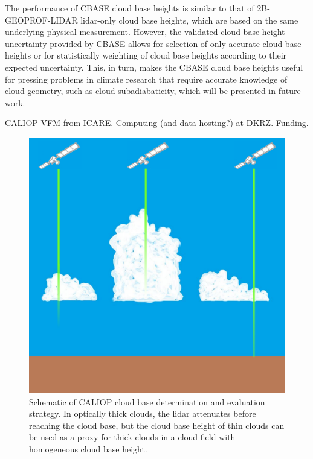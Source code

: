 \documentclass[amt,manuscript]{copernicus}\usepackage[]{graphicx}\usepackage[]{color}
\begin{document}
The performance of CBASE cloud base heights is similar to that of
2B-GEOPROF-LIDAR lidar-only cloud base heights, which are based on the same
underlying physical measurement.  However, the validated cloud base height
uncertainty provided by CBASE allows for selection of only accurate cloud base
heights or for statistically weighting of cloud base heights according to their
expected uncertainty.  This, in turn, makes the CBASE cloud base heights useful
for pressing problems in climate research that require accurate knowledge of
cloud geometry, such as cloud subadiabaticity, which will be presented in future
work. 

\begin{acknowledgements}
CALIOP VFM from ICARE.  Computing (and data hosting?) at DKRZ.  Funding.
\end{acknowledgements}


\begin{figure}
  \centering
  \includegraphics[width=0.5\linewidth,keepaspectratio=true]{CloudFieldCALIOP.pdf}
  \caption{Schematic of CALIOP cloud base determination and evaluation
    strategy.  In optically thick clouds, the lidar attenuates before reaching
    the cloud base, but the cloud base height of thin clouds can be used as a
    proxy for thick clouds in a cloud field with homogeneous cloud base height.}
  \label{fig:method}
\end{figure}
\end{document}
